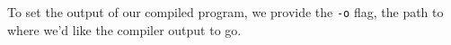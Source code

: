 %
To set the output of our compiled program, we provide the \texttt{-o}
flag, the path to where we'd like the compiler output to go.
